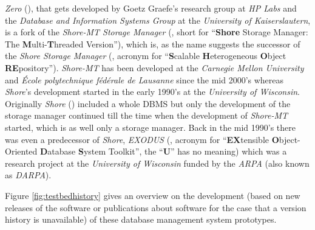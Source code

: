 	\emph{Zero} (\cite{Zero}), that gets developed by Goetz Graefe's research group at \emph{HP Labs} and the \emph{Database and Information Systems Group} at the \emph{University of Kaiserslautern}, is a fork of the \emph{Shore-MT Storage Manager} (\cite{ShoreMT}, short for ``\textbf{Shore} Storage Manager: The \textbf{M}ulti-\textbf{T}hreaded Version''), which is, as the name suggests the successor of the \emph{Shore Storage Manager} (\cite{SSM}, acronym for ``\textbf{S}calable \textbf{H}eterogeneous \textbf{O}bject \textbf{RE}pository''). \emph{Shore-MT} has been developed at the \emph{Carnegie Mellon University} and \emph{École polytechnique fédérale de Lausanne} since the mid 2000's whereas \emph{Shore}'s development started in the early 1990's at the \emph{University of Wisconsin}. Originally \emph{Shore} (\cite{Shore}) included a whole DBMS but only the development of the storage manager continued till the time when the development of \emph{Shore-MT} started, which is as well only a storage manager. Back in the mid 1990's there was even a predecessor of \emph{Shore}, \emph{EXODUS} (\cite{EXODUS}, acronym for ``\textbf{EX}tensible \textbf{O}bject-Oriented \textbf{D}atabase \textbf{S}ystem Toolkit'', the ``\textbf{U}'' has no meaning) which was a research project at the \emph{University of Wisconsin} funded by the \emph{ARPA} (also known as \emph{DARPA}).
	
	Figure \ref{fig:testbedhistory} gives an overview on the development (based on new releases of the software or publications about software for the case that a version history is unavailable) of these database management system prototypes.
	
	
